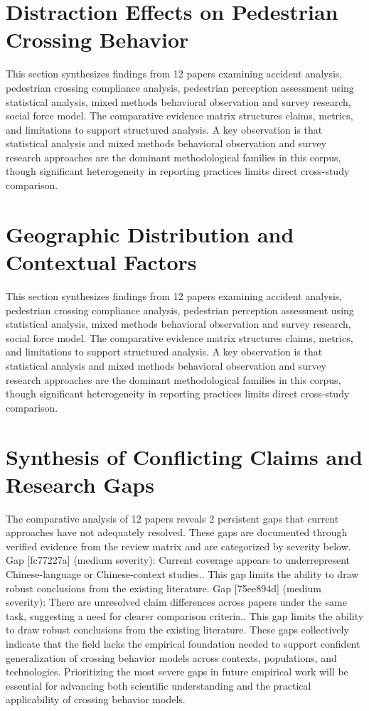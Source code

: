 \documentclass{article}
\begin{document}
\section{Distraction Effects on Pedestrian Crossing Behavior}
This section synthesizes findings from 12 papers examining accident analysis, pedestrian crossing compliance analysis, pedestrian perception assessment using statistical analysis, mixed methods behavioral observation and survey research, social force model. The comparative evidence matrix structures claims, metrics, and limitations to support structured analysis. A key observation is that statistical analysis and mixed methods behavioral observation and survey research approaches are the dominant methodological families in this corpus, though significant heterogeneity in reporting practices limits direct cross-study comparison.

\section{Geographic Distribution and Contextual Factors}
This section synthesizes findings from 12 papers examining accident analysis, pedestrian crossing compliance analysis, pedestrian perception assessment using statistical analysis, mixed methods behavioral observation and survey research, social force model. The comparative evidence matrix structures claims, metrics, and limitations to support structured analysis. A key observation is that statistical analysis and mixed methods behavioral observation and survey research approaches are the dominant methodological families in this corpus, though significant heterogeneity in reporting practices limits direct cross-study comparison.

\section{Synthesis of Conflicting Claims and Research Gaps}
The comparative analysis of 12 papers reveals 2 persistent gaps that current approaches have not adequately resolved. These gaps are documented through verified evidence from the review matrix and are categorized by severity below. Gap [fc77227a] (medium severity): Current coverage appears to underrepresent Chinese-language or Chinese-context studies.. This gap limits the ability to draw robust conclusions from the existing literature. Gap [75ee894d] (medium severity): There are unresolved claim differences across papers under the same task, suggesting a need for clearer comparison criteria.. This gap limits the ability to draw robust conclusions from the existing literature. These gaps collectively indicate that the field lacks the empirical foundation needed to support confident generalization of crossing behavior models across contexts, populations, and technologies. Prioritizing the most severe gaps in future empirical work will be essential for advancing both scientific understanding and the practical applicability of crossing behavior models.
\end{document}
